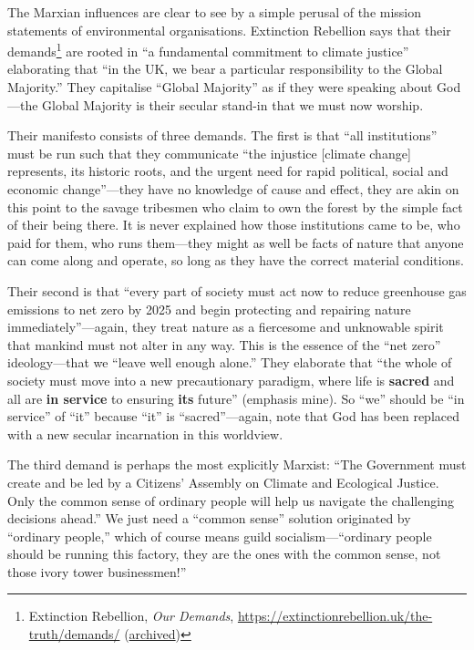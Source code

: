 \documentclass[11pt]{article}
\begin{document}
The Marxian influences are clear to see by a simple perusal of the mission statements of environmental organisations. Extinction Rebellion says that their demands\footnote{Extinction Rebellion, \emph{Our Demands}, \url{https://extinctionrebellion.uk/the-truth/demands/} (\href{https://archive.ph/osUoL}{archived})} are rooted in ``a fundamental commitment to climate justice'' elaborating that ``in the UK, we bear a particular responsibility to the Global Majority.'' They capitalise ``Global Majority'' as if they were speaking about God---the Global Majority is their secular stand-in that we must now worship.

Their manifesto consists of three demands. The first is that ``all institutions'' must be run such that they communicate ``the injustice [climate change] represents, its historic roots, and the urgent need for rapid political, social and economic change''---they have no knowledge of cause and effect, they are akin on this point to the savage tribesmen who claim to own the forest by the simple fact of their being there. It is never explained how those institutions came to be, who paid for them, who runs them---they might as well be facts of nature that anyone can come along and operate, so long as they have the correct material conditions.

Their second is that ``every part of society must act now to reduce greenhouse gas emissions to net zero by 2025 and begin protecting and repairing nature immediately''---again, they treat nature as a fiercesome and unknowable spirit that mankind must not alter in any way. This is the essence of the ``net zero'' ideology---that we ``leave well enough alone.'' They elaborate that ``the whole of society must move into a new precautionary paradigm, where life is \textbf{sacred} and all are \textbf{in service} to ensuring \textbf{its} future'' (emphasis mine). So ``we'' should be ``in service'' of ``it'' because ``it'' is ``sacred''---again, note that God has been replaced with a new secular incarnation in this worldview.

The third demand is perhaps the most explicitly Marxist: ``The Government must create and be led by a Citizens’ Assembly on Climate and Ecological Justice. Only the common sense of ordinary people will help us navigate the challenging decisions ahead.'' We just need a ``common sense'' solution originated by ``ordinary people,'' which of course means guild socialism---``ordinary people should be running this factory, they are the ones with the common sense, not those ivory tower businessmen!''
\end{document}

